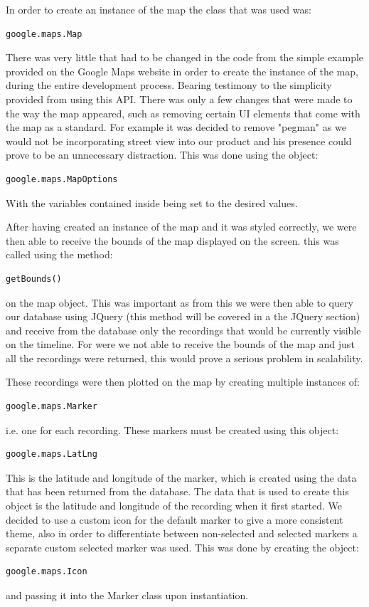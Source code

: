 \documentclass{l3proj}
\begin{document}
In order to create an instance of the map the class that was used was:
\begin{verbatim}
google.maps.Map
\end{verbatim}
There was very little that had to be changed in the code from the simple example provided on the Google Maps website in order to create the instance of the map, during the entire development process. Bearing testimony to the simplicity provided from using this API. There was only a few changes that were made to the way the map appeared, such as removing certain UI elements that come with the map as a standard. For example it was decided to remove "pegman" as we would not be incorporating street view into our product and his presence could prove to be an unnecessary distraction. This was done
using the object:
\begin{verbatim}
google.maps.MapOptions
\end{verbatim}
With the variables contained inside being set to the desired values.

After having created an instance of the map and it was styled correctly, we were then able to receive the bounds of the map displayed on the screen. this was called using the method:
\begin{verbatim}
getBounds()
\end{verbatim}
on the map object. This was important as from this we were then able to query our database using JQuery (this method will be covered in a the JQuery section) and receive from the database only the recordings that would be currently visible on the timeline. For were we not able to receive the bounds of the map and just all the recordings were returned, this would prove a serious problem in scalability.

These recordings were then plotted on the map by creating multiple instances of:
\begin{verbatim}
google.maps.Marker
\end{verbatim}
i.e. one for each recording. These markers must be created using this object:
\begin{verbatim}
google.maps.LatLng
\end{verbatim}
This is the latitude and longitude of the marker, which is created using the data that has been returned from the database. The data that is used to create this object is the latitude and longitude of the recording when it first started. We decided to use a custom icon for the default marker to give a more consistent theme, also in order to differentiate between non-selected and selected markers a separate custom selected marker was used. This was done by creating the object:
\begin{verbatim}
google.maps.Icon
\end{verbatim}
and passing it into the Marker class upon instantiation.
\end{document}
